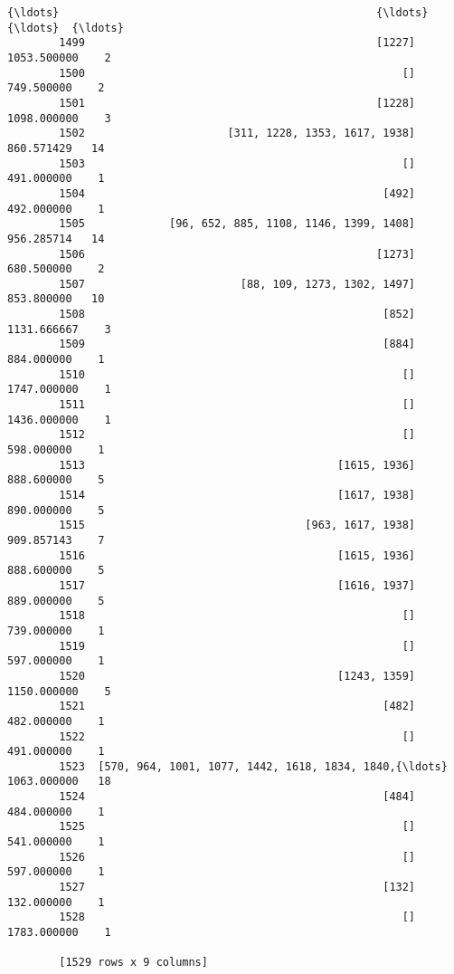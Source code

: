 \documentclass[11pt]{article}
\begin{document}
\begin{Verbatim}[commandchars=\\\{\}]
        {\ldots}                                                 {\ldots}          {\ldots}  {\ldots}  
        1499                                             [1227]  1053.500000    2  
        1500                                                 []   749.500000    2  
        1501                                             [1228]  1098.000000    3  
        1502                      [311, 1228, 1353, 1617, 1938]   860.571429   14  
        1503                                                 []   491.000000    1  
        1504                                              [492]   492.000000    1  
        1505             [96, 652, 885, 1108, 1146, 1399, 1408]   956.285714   14  
        1506                                             [1273]   680.500000    2  
        1507                        [88, 109, 1273, 1302, 1497]   853.800000   10  
        1508                                              [852]  1131.666667    3  
        1509                                              [884]   884.000000    1  
        1510                                                 []  1747.000000    1  
        1511                                                 []  1436.000000    1  
        1512                                                 []   598.000000    1  
        1513                                       [1615, 1936]   888.600000    5  
        1514                                       [1617, 1938]   890.000000    5  
        1515                                  [963, 1617, 1938]   909.857143    7  
        1516                                       [1615, 1936]   888.600000    5  
        1517                                       [1616, 1937]   889.000000    5  
        1518                                                 []   739.000000    1  
        1519                                                 []   597.000000    1  
        1520                                       [1243, 1359]  1150.000000    5  
        1521                                              [482]   482.000000    1  
        1522                                                 []   491.000000    1  
        1523  [570, 964, 1001, 1077, 1442, 1618, 1834, 1840,{\ldots}  1063.000000   18  
        1524                                              [484]   484.000000    1  
        1525                                                 []   541.000000    1  
        1526                                                 []   597.000000    1  
        1527                                              [132]   132.000000    1  
        1528                                                 []  1783.000000    1  
        
        [1529 rows x 9 columns]
\end{Verbatim}
            
\end{document}
